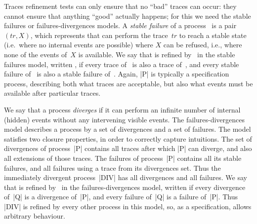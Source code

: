 Traces refinement tests can only ensure that no ``bad'' traces can occur: they
cannot ensure that anything ``good'' actually happens; for this we need the
stable failures or failures-divergences models.  A \emph{stable failure} of a
process~ is a pair $(tr,X)$, which represents that  can
perform the trace~$tr$ to reach a stable state (i.e.~where no internal events
are possible) where $X$ can be refused, i.e., where none of the events of~$X$
is available.  We say that  is refined by~ in the stable
failures model, written \CSPM{P [F= Q}, if every trace of~ is also a
trace of~, and every stable failure of~ is also a stable
failure of~.  Again, |P| is typically a specification process,
describing both what traces are acceptable, but also what events must be
available after particular traces. 

We say that a process \emph{diverges} if it can perform an infinite number of
internal (hidden) events without any intervening visible events.  The
failures-divergences model describes a process by a set of divergences and a
set of failures.  The model satisfies two closure properties, in order to
correctly capture intuitions.  The set of divergences of process~|P| contains
all traces after which |P| can diverge, and also all extensions of those
traces.  The failures of process~|P| contains all its stable failures, and all
failures using a trace from its divergences set.  Thus the immediately
divergent process~|DIV| has all divergences and all failures.  We say that
 is refined by~ in the failures-divergences model, written
\CSPM{P [FD= Q}
if every divergence of~|Q| is a divergence of~|P|, and every failure of~|Q| is
a failure of~|P|.  Thus |DIV| is refined by every other process in this model,
so, as a specification, allows arbitrary behaviour.






